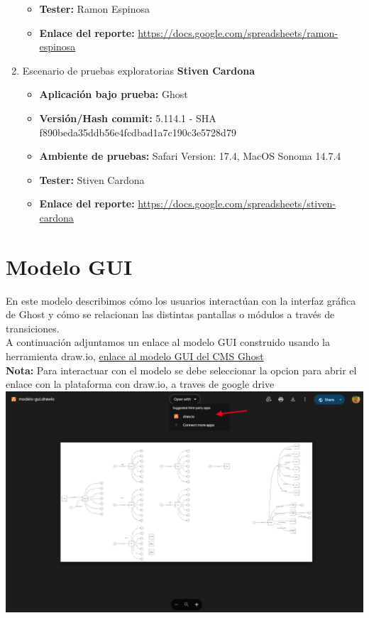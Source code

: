 \documentclass[report,12pt]{article}
\begin{document}
\begin{enumerate}
\begin{itemize}
        \item \textbf{Tester:} Ramon Espinosa
        \item \textbf{Enlace del reporte:} \href{https://docs.google.com/spreadsheets/d/1AW5Uuod1t0fUaCuIDGt3VsMxNsfL1ElC/edit?gid=820482743#gid=820482743}{https://docs.google.com/spreadsheets/ramon-espinosa}
    \end{itemize}
    \item Escenario de pruebas exploratorias \textbf{Stiven Cardona}
    \begin{itemize}
        \item \textbf{Aplicación bajo prueba:} Ghost
        \item \textbf{Versión/Hash commit:} 5.114.1 - SHA f890beda35ddb56e4fcdbad1a7c190c3e5728d79
        \item \textbf{Ambiente de pruebas:} Safari Version: 17.4, MacOS Sonoma 14.7.4
        \item \textbf{Tester:} Stiven Cardona
        \item \textbf{Enlace del reporte:} \href{https://docs.google.com/spreadsheets/d/1AW5Uuod1t0fUaCuIDGt3VsMxNsfL1ElC/edit?gid=1462193001#gid=1462193001}{https://docs.google.com/spreadsheets/stiven-cardona}
    \end{itemize}
\end{enumerate}

\section{Modelo GUI}
En este modelo describimos cómo los usuarios interactúan con la interfaz gráfica de Ghost y cómo se relacionan las distintas pantallas o módulos a través de transiciones.\\

A continuación adjuntamos un enlace al modelo GUI construido usando la herramienta draw.io, \href{https://drive.google.com/file/d/1O5UubtcBZ5smm2bCaAbsnGFKy3dRc_7O/view?usp=sharing}{enlace al modelo GUI del CMS Ghost}\\


\textbf{Nota:} Para interactuar con el modelo se debe seleccionar la opcion para abrir el enlace con la plataforma con draw.io, a traves de google drive\\

\includegraphics[width=1\linewidth]{image.png}
\end{document}
